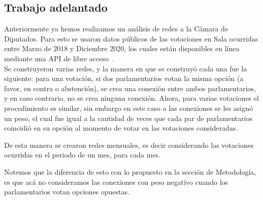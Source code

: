 \documentclass[hyperref]{proyectotesis}
\begin{document}
\subsection{Trabajo adelantado}
Anteriormente ya hemos realizamos un análisis de redes a la Cámara de Diputados. Para esto se usaron datos públicos de las votaciones en Sala ocurridas entre Marzo de 2018 y Diciembre 2020, los cuales están disponibles en línea mediante una API de libre acceso~\cite{api}.\\ 

Se construyeron varias redes, y la manera en que se construyó cada una fue la siguiente: para una votación, si dos parlamentarios votan la misma opción (a favor, en contra o  abstención), se crea una conexión entre ambos parlamentarios, y en caso contrario, no se crea ninguna conexión. Ahora, para varias votaciones el procedimiento es similar, sin embargo en este caso a las conexiones se les asignó un peso, el cual fue igual a la cantidad de veces que cada par de parlamentarios coincidió en su opción al momento de votar en las votaciones consideradas.

De esta manera se crearon redes mensuales, es decir considerando las votaciones ocurridas en el periodo de un mes, para cada mes.

Notemos que la diferencia de esto con lo propuesto en la sección de Metodología, es que acá no consideramos las conexiones con peso negativo cuando los parlamentarios votan opciones opuestas.\\
\end{document}
